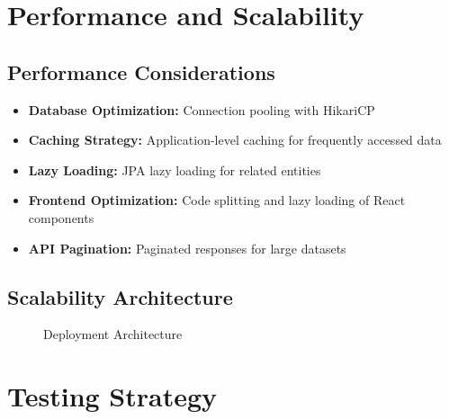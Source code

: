 \documentclass[12pt,a4paper]{article}
\begin{document}
\section{Performance and Scalability}

\subsection{Performance Considerations}

\begin{itemize}
    \item \textbf{Database Optimization:} Connection pooling with HikariCP
    \item \textbf{Caching Strategy:} Application-level caching for frequently accessed data
    \item \textbf{Lazy Loading:} JPA lazy loading for related entities
    \item \textbf{Frontend Optimization:} Code splitting and lazy loading of React components
    \item \textbf{API Pagination:} Paginated responses for large datasets
\end{itemize}

\subsection{Scalability Architecture}

\begin{figure}[H]
\centering
{}
\caption{Deployment Architecture}
\label{fig:deployment-architecture}
\end{figure}

\section{Testing Strategy}
\end{document}
